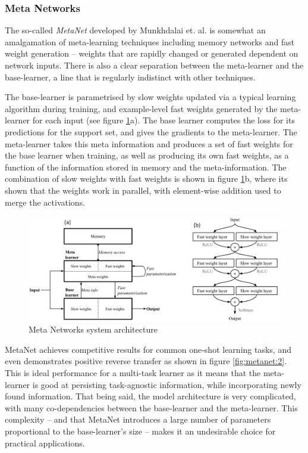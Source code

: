 \documentclass{report}
\begin{document}
	\subsubsection{Meta Networks}
	The so-called \emph{MetaNet} developed by Munkhdalai et. al. \parencite{mn} is somewhat an amalgamation of meta-learning techniques including memory networks and fast weight generation -- weights that are rapidly changed or generated dependent on network inputs. There is also a clear separation between the meta-learner and the base-learner, a line that is regularly indistinct with other techniques. \par
	The base-learner is parametrised by slow weights updated via a typical learning algorithm during training, and example-level fast weights generated by the meta-learner for each input (see figure \ref{fig:metanet:1}a). The base learner computes the loss for its predictions for the support set, and gives the gradients to the meta-learner. The meta-learner takes this meta information and produces a set of fast weights for the base learner when training, as well as producing its own fast weights, as a function of the information stored in memory and the meta-information. The combination of slow weights with fast weights is shown in figure \ref{fig:metanet:1}b, where its shown that the weights work in parallel, with element-wise addition used to merge the activations. \par
	\begin{figure}[h]
		\centering
		\includegraphics[width=15cm]{metanet1}
		\caption{Meta Networks system architecture}
		\label{fig:metanet:1}
	\end{figure}
	MetaNet achieves competitive results for common one-shot learning tasks, and even demonstrates positive reverse transfer as shown in figure \ref{fig:metanet:2}. This is ideal performance for a multi-task learner as it means that the meta-learner is good at persisting task-agnostic information, while incorporating newly found information. That being said, the model architecture is very complicated, with many co-dependencies between the base-learner and the meta-learner. This complexity -- and that MetaNet introduces a large number of parameters proportional to the base-learner's size -- makes it an undesirable choice for practical applications.  \newline \newline
\end{document}
